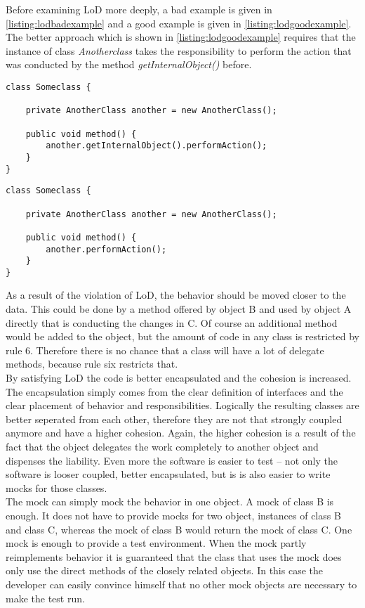 Before examining \ac{LoD} more deeply, a bad example is given in \ref{listing:lodbadexample} and a good example is given in \ref{listing:lodgoodexample}. The better approach which is shown in \ref{listing:lodgoodexample} requires that the instance of class \textit{Anotherclass} takes the responsibility to perform the action that was conducted by the method \textit{getInternalObject()} before.
\\
\begin{lstlisting}
class Someclass {

	private AnotherClass another = new AnotherClass();

	public void method() {
		another.getInternalObject().performAction();
	}
}
\end{lstlisting}
\label{listing:lodbadexample}

\begin{lstlisting}
class Someclass {

	private AnotherClass another = new AnotherClass();

	public void method() {
		another.performAction();
	}
}
\end{lstlisting}
\label{listing:lodgoodexample}


As a result of the violation of \ac{LoD}, the behavior should be moved closer to the data. This could be done by a method offered by object B and used by object A directly that is conducting the changes in C. Of course an additional method would be added to the object, but the amount of code in any class is restricted by rule 6. Therefore there is no chance that a class will have a lot of delegate methods, because rule six restricts that. 
\\

By satisfying \ac{LoD} the code is better encapsulated and the cohesion is increased. The encapsulation simply comes from the clear definition of interfaces and the clear placement of behavior and responsibilities. Logically the resulting classes are better seperated from each other, therefore they are not that strongly coupled anymore and have a higher cohesion. Again, the higher cohesion is a result of the fact that the object delegates the work completely to another object and dispenses the liability. Even more the software is easier to test -- not only the software is looser coupled, better encapsulated, but is is also easier to write mocks for those classes.
\\

The mock can simply mock the behavior in one object. A mock of class B is enough. It does not have to provide mocks for two object, instances of class B and class C, whereas the mock of class B would return the mock of class C. One mock is enough to provide a test environment. When the mock partly reimplements behavior it is guaranteed that the class that uses the mock does only use the direct methods of the closely related objects. In this case the developer can easily convince himself that no other mock objects are necessary to make the test run.
\\

